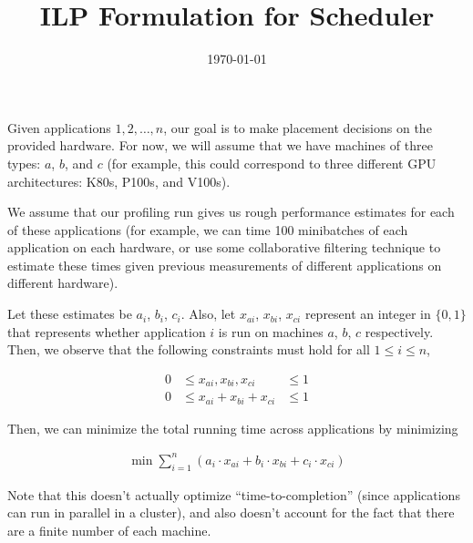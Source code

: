 \documentclass{article}
\title{ILP Formulation for Scheduler}
\date{\today}
\begin{document}
\maketitle

Given applications $1, 2, \ldots, n$, our goal is to make placement
decisions on the provided hardware. For now, we will assume that we have machines
of three types: $a$, $b$, and $c$ (for example, this could correspond to three
different GPU architectures: K80s, P100s, and V100s).

We assume that our profiling run gives us rough performance estimates for each
of these applications (for example, we can time 100 minibatches of each application
on each hardware, or use some collaborative filtering technique to estimate these
times given previous measurements of different applications on different hardware).

Let these estimates be $a_i$, $b_i$, $c_i$. Also, let $x_{ai}$, $x_{bi}$, $x_{ci}$ represent
an integer in $\{0, 1\}$ that represents whether application $i$ is run on
machines $a$, $b$, $c$ respectively. Then, we observe that the following constraints
must hold for all $1 \leq i \leq n$,

\begin{eqnarray}
0 &\leq x_{ai}, x_{bi}, x_{ci}   &\leq 1 \nonumber \\
0 &\leq x_{ai} + x_{bi} + x_{ci} &\leq 1 \nonumber
\end{eqnarray}

Then, we can minimize the total running time across applications by minimizing

\begin{eqnarray}
\min \sum_{i=1}^n (a_i \cdot x_{ai} + b_i \cdot x_{bi} + c_i \cdot x_{ci}) \nonumber
\end{eqnarray}

Note that this doesn't actually optimize ``time-to-completion'' (since applications
can run in parallel in a cluster), and also doesn't account for the fact that
there are a finite number of each machine.
\end{document}
